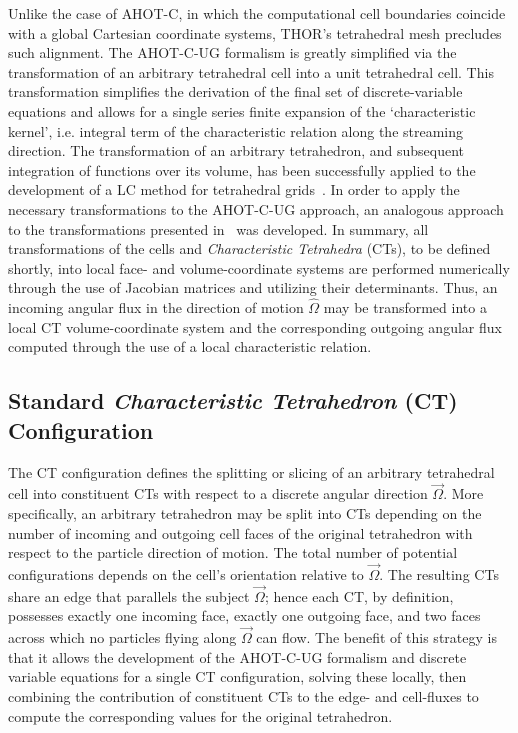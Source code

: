 Unlike the case of \ac{AHOT-C}, in which the computational cell boundaries coincide with a global Cartesian coordinate systems, \ac{THOR}'s tetrahedral mesh precludes such alignment.
The \ac{AHOT-C-UG} formalism is greatly simplified via the transformation of an arbitrary tetrahedral cell into a unit tetrahedral cell.
This transformation simplifies the derivation of the final set of discrete-variable equations and allows for a single series finite expansion of the `characteristic kernel', i.e. integral term of the characteristic relation along the streaming direction.
The transformation of an arbitrary tetrahedron, and subsequent integration of functions over its volume, has been successfully applied to the development of a \ac{LC} method for tetrahedral grids~\cite{Mathews2000}.
In order to apply the necessary transformations to the \ac{AHOT-C-UG} approach, an analogous approach to the transformations presented in~\cite{Mathews2000} was developed.
In summary, all transformations of the cells and \textit{Characteristic Tetrahedra} (\ac{CT}s), to be defined shortly, into local face- and volume-coordinate systems are performed numerically through the use of Jacobian matrices and utilizing their determinants.
Thus, an incoming angular flux in the direction of motion $\hat{\Omega}$ may be transformed into a local \ac{CT} volume-coordinate system and the corresponding outgoing angular flux computed through the use of a local characteristic relation.


\subsection{Standard \textit{Characteristic Tetrahedron} (\ac{CT}) Configuration}

The \ac{CT} configuration defines the splitting or slicing of an arbitrary tetrahedral cell into constituent \ac{CT}s with respect to a discrete angular direction $\vec{\Omega}$.
More specifically, an arbitrary tetrahedron may be split into \ac{CT}s depending on the number of incoming and outgoing cell faces of the original tetrahedron with respect to the particle direction of motion.
The total number of potential configurations depends on the cell's orientation relative to $\vec{\Omega}$.
The resulting \ac{CT}s share an edge that parallels the subject $\vec{\Omega}$; hence each \ac{CT}, by definition, possesses exactly one incoming face, exactly one outgoing face, and two faces across which no particles flying along $\vec{\Omega}$ can flow.
The benefit of this strategy is that it allows the development of the \ac{AHOT-C-UG} formalism and discrete variable equations for a single \ac{CT} configuration, solving these locally, then combining the contribution of constituent \ac{CT}s to the edge- and cell-fluxes to compute the corresponding values for the original tetrahedron.

